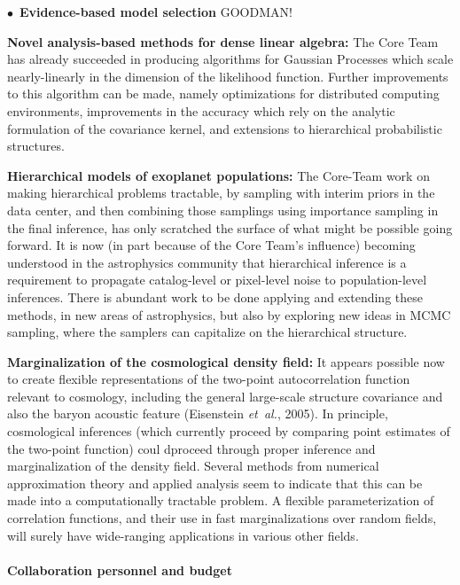 \documentclass[12pt]{article}
\newcommand{\foreign}[1]{\textsl{#1}}
\newcommand{\etal}{\foreign{et~al.}}
\newcommand{\hoggitem}{$\bullet$}
\begin{document}
\hoggitem~\textbf{Evidence-based model selection} GOODMAN!

\textbf{Novel analysis-based methods for dense linear algebra:}
The Core Team has already succeeded in producing algorithms for Gaussian
Processes which scale nearly-linearly in the dimension of the likelihood
function.
Further improvements to this algorithm can be made, namely optimizations
for distributed computing environments, improvements in the accuracy
which rely on the analytic formulation of the covariance kernel, and
extensions to hierarchical probabilistic structures.

\textbf{Hierarchical models of exoplanet populations:}
The Core-Team work on making hierarchical problems tractable, by
sampling with interim priors in the data center, and then combining
those samplings using importance sampling in the final inference, has
only scratched the surface of what might be possible going forward.
It is now (in part because of the Core Team's influence) becoming
understood in the astrophysics community that hierarchical inference
is a requirement to propagate catalog-level or pixel-level noise to
population-level inferences.
There is abundant work to be done applying and extending these
methods, in new areas of astrophysics, but also by exploring new ideas
in MCMC sampling, where the samplers can capitalize on the
hierarchical structure.

\textbf{Marginalization of the cosmological density field:} 
It appears possible now to create flexible representations of the
two-point autocorrelation function relevant to cosmology, including
the general large-scale structure covariance and also the baryon
acoustic feature (Eisenstein \etal, 2005).
In principle, cosmological inferences (which currently proceed by
comparing point estimates of the two-point function) coul dproceed
through proper inference and marginalization of the density field.
Several methods from numerical approximation theory and applied analysis
seem to indicate that this can be made into a computationally tractable 
problem.
A flexible parameterization of correlation functions, and their use in
fast marginalizations over random fields, will surely have wide-ranging
applications in various other fields.

\paragraph{Collaboration personnel and budget}
\end{document}
